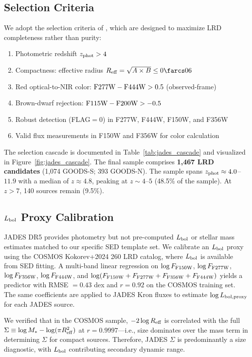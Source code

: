 \documentclass[twocolumn,linenumbers]{aastex631}
\begin{document}
\subsection{Selection Criteria}

We adopt the selection criteria of \citet{Rinaldi2026}, which are designed to maximize LRD completeness rather than purity:

\begin{enumerate}
\item Photometric redshift $z_{\rm phot} > 4$
\item Compactness: effective radius $R_{\rm eff} = \sqrt{A \times B} \leq 0\farcs06$
\item Red optical-to-NIR color: ${\rm F277W} - {\rm F444W} > 0.5$ (observed-frame)
\item Brown-dwarf rejection: ${\rm F115W} - {\rm F200W} > -0.5$
\item Robust detection (FLAG$=0$) in F277W, F444W, F150W, and F356W
\item Valid flux measurements in F150W and F356W for color calculation
\end{enumerate}

The selection cascade is documented in Table~\ref{tab:jades_cascade} and visualized in Figure~\ref{fig:jades_cascade}. The final sample comprises \textbf{1,467 LRD candidates} (1,074 GOODS-S; 393 GOODS-N). The sample spans $z_{\rm phot} \approx 4.0$--$11.9$ with a median of $z \approx 4.8$, peaking at $z \sim 4$--$5$ (48.5\% of the sample). At $z > 7$, 140 sources remain (9.5\%).

\subsection{$L_{\rm bol}$ Proxy Calibration}

JADES DR5 provides photometry but not pre-computed $L_{\rm bol}$ or stellar mass estimates matched to our specific SED template set. We calibrate an $L_{\rm bol}$ proxy using the COSMOS Kokorev+2024 260 LRD catalog, where $L_{\rm bol}$ is available from SED fitting. A multi-band linear regression on $\log F_{\rm F150W}$, $\log F_{\rm F277W}$, $\log F_{\rm F356W}$, $\log F_{\rm F444W}$, and $\log(F_{\rm F150W} + F_{\rm F277W} + F_{\rm F356W} + F_{\rm F444W})$ yields a predictor with RMSE $= 0.43$ dex and $r = 0.92$ on the COSMOS training set. The same coefficients are applied to JADES Kron fluxes to estimate $\log L_{\rm bol, proxy}$ for each JADES source.

We verified that in the COSMOS sample, $-2\log R_{\rm eff}$ is correlated with the full $\Sigma \equiv \log M_* - \log(\pi R_{\rm eff}^2)$ at $r = 0.9997$---i.e., size dominates over the mass term in determining $\Sigma$ for compact sources. Therefore, JADES $\Sigma$ is predominantly a size diagnostic, with $L_{\rm bol}$ contributing secondary dynamic range.
\end{document}
